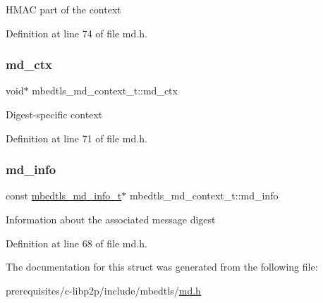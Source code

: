 H\+M\+AC part of the context 

Definition at line 74 of file md.\+h.

\mbox{\label{structmbedtls__md__context__t_af7dc1e93cbd6f9a3c52d1a5064732fe1}} 
\subsubsection{\texorpdfstring{md\+\_\+ctx}{md\_ctx}}
{\footnotesize\ttfamily void$\ast$ mbedtls\+\_\+md\+\_\+context\+\_\+t\+::md\+\_\+ctx}

Digest-\/specific context 

Definition at line 71 of file md.\+h.

\mbox{\label{structmbedtls__md__context__t_a946ec8104697a039cf1990233cd41b28}} 
\subsubsection{\texorpdfstring{md\+\_\+info}{md\_info}}
{\footnotesize\ttfamily const \mbox{\hyperlink{structmbedtls__md__info__t}{mbedtls\+\_\+md\+\_\+info\+\_\+t}}$\ast$ mbedtls\+\_\+md\+\_\+context\+\_\+t\+::md\+\_\+info}

Information about the associated message digest 

Definition at line 68 of file md.\+h.



The documentation for this struct was generated from the following file\+:\begin{DoxyCompactItemize}
\item 
prerequisites/c-\/libp2p/include/mbedtls/\mbox{\hyperlink{md_8h}{md.\+h}}\end{DoxyCompactItemize}
